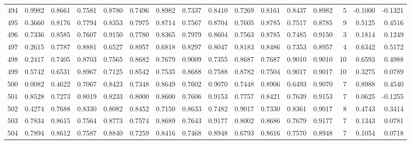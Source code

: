 \begin{tabular}{lrrrrrrrrrrrrrrr}
494 &      0.9982 &  0.8661 &  0.7581 &  0.8780 &  0.7496 &  0.8982 &  0.7337 &  0.8410 &  0.7269 &  0.8161 &   0.8437 &     0.8982 &      5 &                   -0.1000 &                    -0.1321 \\
495 &      0.3660 &  0.8176 &  0.7794 &  0.8353 &  0.7975 &  0.8714 &  0.7567 &  0.8704 &  0.7605 &  0.8785 &   0.7517 &     0.8785 &      9 &                    0.5125 &                     0.4516 \\
496 &      0.7336 &  0.8585 &  0.7607 &  0.9150 &  0.7780 &  0.8365 &  0.7979 &  0.8604 &  0.7563 &  0.8785 &   0.7485 &     0.9150 &      3 &                    0.1814 &                     0.1249 \\
497 &      0.2615 &  0.7787 &  0.8881 &  0.6527 &  0.8957 &  0.6818 &  0.8297 &  0.8047 &  0.8183 &  0.8486 &   0.7353 &     0.8957 &      4 &                    0.6342 &                     0.5172 \\
498 &      0.2417 &  0.7405 &  0.8703 &  0.7565 &  0.8682 &  0.7679 &  0.9009 &  0.7355 &  0.8687 &  0.7687 &   0.9010 &     0.9010 &     10 &                    0.6593 &                     0.4988 \\
499 &      0.5742 &  0.6531 &  0.8967 &  0.7125 &  0.8542 &  0.7535 &  0.8688 &  0.7588 &  0.8782 &  0.7504 &   0.9017 &     0.9017 &     10 &                    0.3275 &                     0.0789 \\
500 &      0.0082 &  0.4622 &  0.7067 &  0.8423 &  0.7348 &  0.8649 &  0.7602 &  0.9070 &  0.7448 &  0.8906 &   0.6493 &     0.9070 &      7 &                    0.8988 &                     0.4540 \\
501 &      0.8528 &  0.7273 &  0.8019 &  0.8233 &  0.8000 &  0.8600 &  0.7606 &  0.9153 &  0.7757 &  0.8421 &   0.7639 &     0.9153 &      7 &                    0.0625 &                    -0.1255 \\
502 &      0.4274 &  0.7688 &  0.8330 &  0.8082 &  0.8452 &  0.7150 &  0.8633 &  0.7482 &  0.9017 &  0.7330 &   0.8361 &     0.9017 &      8 &                    0.4743 &                     0.3414 \\
503 &      0.7834 &  0.8615 &  0.7564 &  0.8773 &  0.7574 &  0.8689 &  0.7643 &  0.9177 &  0.8002 &  0.8686 &   0.7679 &     0.9177 &      7 &                    0.1343 &                     0.0781 \\
504 &      0.7894 &  0.8612 &  0.7587 &  0.8840 &  0.7259 &  0.8416 &  0.7468 &  0.8948 &  0.6793 &  0.8616 &   0.7570 &     0.8948 &      7 &                    0.1054 &                     0.0718 \\

\end{tabular}
